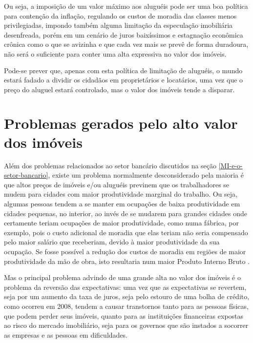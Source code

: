 \documentclass[
	12pt,				%
	oneside,			%
	a4paper,			%
	chapter=TITLE,		%
	section=TITLE,		%
	english,			%
	brazil				%
	]{abntex2}
\begin{document}
Ou seja, a imposição de um valor máximo aos aluguéis pode ser uma boa política
para contenção da inflação, regulando os custos de moradia das classes menos
privilegiadas, impondo também alguma limitação da especulação imobiliária
desenfreada, porém em um cenário de juros baixíssimos e estagnação econômica
crônica como o que se avizinha e que cada vez mais se prevê de forma duradoura,
não será o suficiente para conter uma alta expressiva no valor dos imóveis.

Pode-se prever que, apenas com esta política de limitação de aluguéis, o mundo
estará fadado a dividir os cidadãos em proprietários e locatários, uma vez que o
preço do aluguel estará controlado, mas o valor dos imóveis tende a disparar.

\hypertarget{problemas-gerados-pelo-alto-valor-dos-imuxf3veis}{%
\section{Problemas gerados pelo alto valor dos imóveis}\label{problemas-gerados-pelo-alto-valor-dos-imuxf3veis}}

Além dos problemas relacionados ao setor bancário discutidos na seção
\ref{MI-e-o-setor-bancario}, existe um problema normalmente desconsiderado pela
maioria é que altos preços de imóveis e/ou aluguéis previnem que os
trabalhadores se mudem para cidades com maior produtividade marginal do
trabalho. Ou seja, algumas pessoas tendem a se manter em ocupações de baixa
produtividade em cidades pequenas, no interior, ao invés de se mudarem para
grandes cidades onde certamente teriam ocupações de maior produtividade, como
numa fábrica, por exemplo, pois o custo adicional de moradia que elas teriam
não seria compensado pelo maior salário que receberiam, devido à maior
produtividade da sua ocupação. Se fosse possível a redução dos custos de moradia
em regiões de maior produtividade da mão de obra, isto resultaria num maior
Produto Interno Bruto \autocite[149]{Case2000}.

Mas o principal problema advindo de uma grande alta no valor dos imóveis é o
problema da reversão das expectativas: uma vez que as expectativas se revertem,
seja por um aumento da taxa de juros, seja pelo estouro de uma bolha de crédito,
como ocorreu em 2008, tendem a causar transtornos tanto para as pessoas físicas,
que podem perder seus imóveis, quanto para as instituições financeiras expostas
ao risco do mercado imobiliário, seja para os governos que são instados a
socorrer as empresas e as pessoas em dificuldades.
\end{document}
